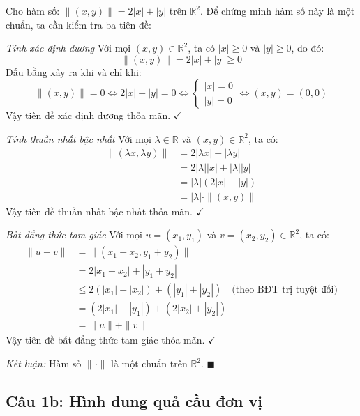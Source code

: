 \begin{solution}
Cho hàm số: $\|(x,y)\| = 2|x| + |y|$ trên $\mathbb{R}^2$.
Để chứng minh hàm số này là một chuẩn, ta cần kiểm tra ba tiên đề:

\textit{Tính xác định dương}
Với mọi $(x,y) \in \mathbb{R}^2$, ta có $|x| \geq 0$ và $|y| \geq 0$, do đó:
\[ 
    \|(x,y)\| = 2|x| + |y| \geq 0 
\]
Dấu bằng xảy ra khi và chỉ khi:
\[ 
    \|(x,y)\| = 0 \Leftrightarrow 2|x| + |y| = 0 \Leftrightarrow 
    \begin{cases}
        |x| = 0 \\
        |y| = 0
    \end{cases}
    \Leftrightarrow (x,y) = (0,0)
\]
Vậy tiên đề xác định dương thỏa mãn. $\checkmark$

\textit{Tính thuần nhất bậc nhất}
Với mọi $\lambda \in \mathbb{R}$ và $(x,y) \in \mathbb{R}^2$, ta có:
\begin{align*}
    \|(\lambda x, \lambda y)\| &= 2|\lambda x| + |\lambda y| \\
    &= 2|\lambda||x| + |\lambda||y| \\
    &= |\lambda|(2|x| + |y|) \\
    &= |\lambda| \cdot \|(x,y)\|
\end{align*}
Vậy tiên đề thuần nhất bậc nhất thỏa mãn. $\checkmark$

\textit{Bất đẳng thức tam giác}
Với mọi $u=(x_1, y_1)$ và $v=(x_2, y_2) \in \mathbb{R}^2$, ta có:
\begin{align*}
    \|u+v\| &= \|(x_1+x_2, y_1+y_2)\| \\
    &= 2|x_1+x_2| + |y_1+y_2| \\
    &\leq 2(|x_1| + |x_2|) + (|y_1| + |y_2|) \quad \text{(theo BĐT trị tuyệt đối)} \\
    &= (2|x_1| + |y_1|) + (2|x_2| + |y_2|) \\
    &= \|u\| + \|v\|
\end{align*}
Vậy tiên đề bất đẳng thức tam giác thỏa mãn. $\checkmark$

\textit{Kết luận:} Hàm số $\|\cdot\|$ là một chuẩn trên $\mathbb{R}^2$. $\blacksquare$
\end{solution}

\subsection*{Câu 1b: Hình dung quả cầu đơn vị}


